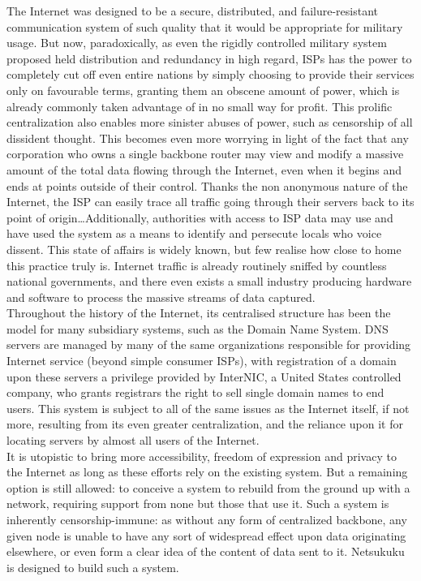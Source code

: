 \documentclass[a4paper]{article}
\begin{document}
The Internet was designed to be a secure, distributed, and failure-resistant
communication system of such quality that it would be appropriate for military
usage. But now, paradoxically, as even the rigidly controlled military system
proposed held distribution and redundancy in high regard, ISPs has the power
to completely cut off even entire nations by simply choosing to provide
their services only on favourable terms\cite{digitaldivide}, granting
them an obscene amount of power, which is already commonly taken
advantage of in no small way for profit. This prolific centralization
also enables more sinister abuses of power, such as censorship of all
dissident thought.
This becomes even more worrying in light of the fact that any corporation who
owns a single backbone router may view and modify a massive amount of the
total data flowing through the Internet, even when it begins and ends at 
points outside of their control. Thanks the non anonymous nature of the 
Internet, the ISP can easily trace all traffic going through their servers
back to its point of origin\dots Additionally, authorities with access 
to ISP data may use and have used the system as a means to identify and 
persecute locals who voice dissent\cite{ipdindymedia}.
This state of affairs is widely known, but few realise how close to home
this practice truly is. Internet traffic is already routinely sniffed by
countless national governments, and there even exists a small industry
producing hardware and software to process the massive streams of data
captured.\\

Throughout the history of the Internet, its centralised 
structure has been the model for many subsidiary systems, such as the
Domain Name System. DNS servers are managed by many of the same organizations
responsible for providing Internet service (beyond simple consumer ISPs), with 
registration of a domain upon these servers a privilege provided by InterNIC, 
a United States controlled company, who grants registrars the right to sell 
single domain names to end users.  This system is subject to all of the same 
issues as the Internet itself, if not more, resulting from its even greater
centralization, and the reliance upon it for locating servers by almost all
users of the Internet.\\

It is utopistic to bring more accessibility, freedom of expression and
privacy to the Internet as long as these efforts rely on the existing
system. But a remaining option is still allowed: to conceive a system to
rebuild from the ground up with a network, requiring support from none
but those that use it. Such a system is inherently censorship-immune:
as without any form of centralized backbone,  any given node is unable
to have any sort of widespread effect upon data originating elsewhere,
or even form a clear idea of the content of data sent to it. Netsukuku
is designed to build such a system.
\end{document}
